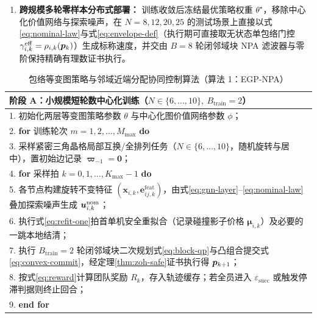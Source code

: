 \begin{enumerate}
 \item \textbf{跨规模多轮零样本分布式部署：} 训练收敛后冻结最优策略权重 $\theta^\star$，移除中心化价值网络与探索噪声，在 $N=8,12,20,25$ 的测试场景上直接以式\eqref{eq:nominal-law}与式\eqref{eq:envelope-def}（执行期可直接取无状态单包络门控 $\gamma_{i,k}^{\mathrm{eff}}=\rho_{i,k}(\boldsymbol{p}_k)$）生成标称速度，并交由 $B=8$ 轮闭邻域块 NPA 滤波器与零阶保持精确有理数证书执行。
\end{enumerate}

\begin{table}[htbp]
 \centering\footnotesize
 \caption{包络等变图策略与邻域近端分配协同控制算法（算法 1：EGP-NPA）}\label{tab:algo1}
 \renewcommand{\arraystretch}{1.12}
 \begin{tabularx}{\columnwidth}{@{}X@{}}
 \toprule
 \textbf{阶段 A：小规模短轮数中心化训练（$N\in\{6,\dots,10\},\ B_{\mathrm{train}}=2$）}\\
 \midrule
 1. 初始化两层等变图策略参数 $\theta$ 与中心化图价值网络参数 $\phi$；\\
 2. \textbf{for} 训练轮次 $m=1,2,\dots,M_{\max}$ \textbf{do}\\
 3. \hspace{1em}采样紧密三角晶格局部互换/全排列任务（$N\in\{6,\dots,10\}$，随机旋转与居中），置初始边记录 $\boldsymbol\varpi_{-1}=\boldsymbol 0$；\\
 4. \hspace{1em}\textbf{for} 采样拍 $k=0,1,\dots,K_{\max}-1$ \textbf{do}\\
 5. \hspace{2em}各节点构建旋转不变特征 $(\boldsymbol x_{i,k},\boldsymbol e_{ij,k}^{\mathrm{feat}})$，由式\eqref{eq:gnn-layer}--\eqref{eq:nominal-law}叠加探索噪声生成 $\boldsymbol{u}_{i,k}^{\mathrm{nom}}$；\\
 6. \hspace{2em}执行式\eqref{eq:refit-one}拍首单机安全重拟合（记录碰撞影子价格 $\boldsymbol\mu_{i,k}$）及必要的一跳本地结清；\\
 7. \hspace{2em}执行 $B_{\mathrm{train}}=2$ 轮闭邻域块二次规划式\eqref{eq:block-qp}与凸组合提交式\eqref{eq:convex-commit}，经定理\ref{thm:zoh-safe}证书执行得 $\boldsymbol{p}_{k+1}$；\\
 8. \hspace{2em}按式\eqref{eq:reward}计算团队奖励 $R_k$，存入轨迹缓存；若全员进入 $\varepsilon_{\mathrm{succ}}$ 或触发停滞判据则终止回合；\\
 9. \hspace{1em}\textbf{end for}\\

\end{tabularx}
\end{table}
